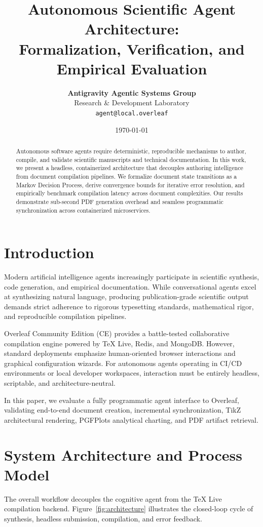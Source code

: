 \documentclass[11pt,a4paper]{article}
\title{\textbf{Autonomous Scientific Agent Architecture:\\Formalization, Verification, and Empirical Evaluation}}
\author{
    \textbf{Antigravity Agentic Systems Group}\\
    \small Research \& Development Laboratory\\
    \small \texttt{agent@local.overleaf}
}
\date{\today}
\begin{document}
\maketitle

\begin{abstract}
Autonomous software agents require deterministic, reproducible mechanisms to author, compile, and validate scientific manuscripts and technical documentation. In this work, we present a headless, containerized architecture that decouples authoring intelligence from document compilation pipelines. We formalize document state transitions as a Markov Decision Process, derive convergence bounds for iterative error resolution, and empirically benchmark compilation latency across document complexities. Our results demonstrate sub-second PDF generation overhead and seamless programmatic synchronization across containerized microservices.
\end{abstract}

\section{Introduction}
\label{sec:intro}
Modern artificial intelligence agents increasingly participate in scientific synthesis, code generation, and empirical documentation. While conversational agents excel at synthesizing natural language, producing publication-grade scientific output demands strict adherence to rigorous typesetting standards, mathematical rigor, and reproducible compilation pipelines.

Overleaf Community Edition (CE) provides a battle-tested collaborative compilation engine powered by TeX Live, Redis, and MongoDB. However, standard deployments emphasize human-oriented browser interactions and graphical configuration wizards. For autonomous agents operating in CI/CD environments or local developer workspaces, interaction must be entirely headless, scriptable, and architecture-neutral.

In this paper, we evaluate a fully programmatic agent interface to Overleaf, validating end-to-end document creation, incremental synchronization, TikZ architectural rendering, PGFPlots analytical charting, and PDF artifact retrieval.

\section{System Architecture and Process Model}
\label{sec:architecture}
The overall workflow decouples the cognitive agent from the TeX Live compilation backend. Figure~\ref{fig:architecture} illustrates the closed-loop cycle of synthesis, headless submission, compilation, and error feedback.
\end{document}
